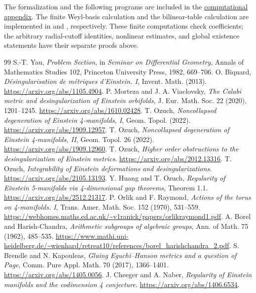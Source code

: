 \documentclass[a4paper,11pt]{article}
\numberwithin{equation}{section}
\theoremstyle{definition}
\begin{document}
The formalization and the following programs are included in
the \href{../references/computations.md}{computational appendix}.
The finite Weyl-basis calculation and the bilinear-table calculation are implemented in
 and
, respectively.
These finite computations check coefficients; the arbitrary radial-cutoff identities, nonlinear estimates, and global existence statements have their separate proofs above.
\clearpage
\begin{thebibliography}{99}
 S.-T. Yau, \emph{Problem Section}, in \emph{Seminar on Differential Geometry}, Annals of Mathematics Studies 102, Princeton University Press, 1982, 669--706.
 O. Biquard, \emph{D\'esingularisation de m\'etriques d'Einstein. I}, Invent. Math. (2013). \url{https://arxiv.org/abs/1105.4904}.
 P. Morteza and J. A. Viaclovsky, \emph{The Calabi metric and desingularization of Einstein orbifolds}, J. Eur. Math. Soc. 22 (2020), 1201--1245. \url{https://arxiv.org/abs/1610.02428}.
 T. Ozuch, \emph{Noncollapsed degeneration of Einstein 4-manifolds, I}, Geom. Topol. (2022). \url{https://arxiv.org/abs/1909.12957}.
 T. Ozuch, \emph{Noncollapsed degeneration of Einstein 4-manifolds, II}, Geom. Topol. 26 (2022). \url{https://arxiv.org/abs/1909.12960}.
 T. Ozuch, \emph{Higher order obstructions to the desingularization of Einstein metrics}. \url{https://arxiv.org/abs/2012.13316}.
 T. Ozuch, \emph{Integrability of Einstein deformations and desingularizations}. \url{https://arxiv.org/abs/2105.13193}.
 Y. Huang and T. Ozuch, \emph{Regularity of Einstein 5-manifolds via 4-dimensional gap theorems}, Theorem 1.1. \url{https://arxiv.org/abs/2512.21317}.
 P. Orlik and F. Raymond, \emph{Actions of the torus on 4-manifolds. I}, Trans. Amer. Math. Soc. 152 (1970), 531--559. \url{https://webhomes.maths.ed.ac.uk/~v1ranick/papers/orlikraymond1.pdf}.
 A. Borel and Harish-Chandra, \emph{Arithmetic subgroups of algebraic groups}, Ann. of Math. 75 (1962), 485--535. \url{https://www.mathi.uni-heidelberg.de/~wienhard/retreat10/references/borel_harishchandra_2.pdf}.
 S. Brendle and N. Kapouleas, \emph{Gluing Eguchi--Hanson metrics and a question of Page}, Comm. Pure Appl. Math. 70 (2017), 1366--1401. \url{https://arxiv.org/abs/1405.0056}.
 J. Cheeger and A. Naber, \emph{Regularity of Einstein manifolds and the codimension 4 conjecture}. \url{https://arxiv.org/abs/1406.6534}.

\end{thebibliography}
\end{document}
